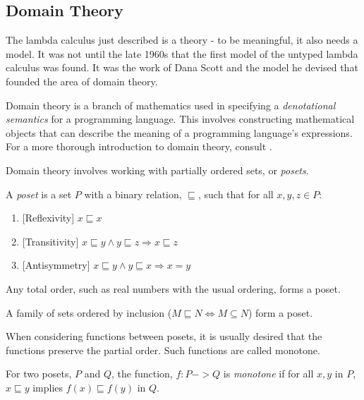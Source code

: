 \subsection{Domain Theory}

The lambda calculus just described is a theory - to be meaningful, it also needs a model.  It was not until the late 1960s that the first model of the untyped lambda calculus was found.  It was the work of Dana Scott \cite{scott1972continuous} and the model he devised that founded the area of domain theory.

Domain theory is a branch of mathematics used in specifying a \emph{denotational semantics} for a programming language.  This involves constructing mathematical objects that can describe the meaning of a programming language's expressions.  For a more thorough introduction to domain theory, consult \cite{gierz2003continuous, abramsky1994domain}. 

Domain theory involves working with partially ordered sets, or \emph{posets}.  

\begin{definition}
A \emph{poset} is a set $P$ with a binary relation, $\sqsubseteq$, such that for all $x,y,z\in P$:
\begin{enumerate}
\item {[}Reflexivity{]} $x\sqsubseteq x$
\item {[}Transitivity{]} $x\sqsubseteq y \wedge y\sqsubseteq z \Rightarrow x\sqsubseteq z$
\item {[}Antisymmetry{]} $x\sqsubseteq y \wedge y\sqsubseteq x \Rightarrow x = y$
\end{enumerate}
\end{definition}

\begin{example}
Any total order, such as real numbers with the usual ordering, forms a poset.
\end{example}
\begin{example}
A family of sets ordered by inclusion ($M \sqsubseteq N \Leftrightarrow M\subseteq N$) form a poset.
\end{example}

When considering functions between posets, it is usually desired that the functions preserve the partial order.  Such functions are called monotone.
\begin{definition}
For two posets, $P$ and $Q$, the function, $f:P->Q$ is \emph{monotone} if for all $x,y$ in $P$, $x\sqsubseteq y$ implies $f(x)\sqsubseteq f(y)$ in $Q$.
\end{definition}

